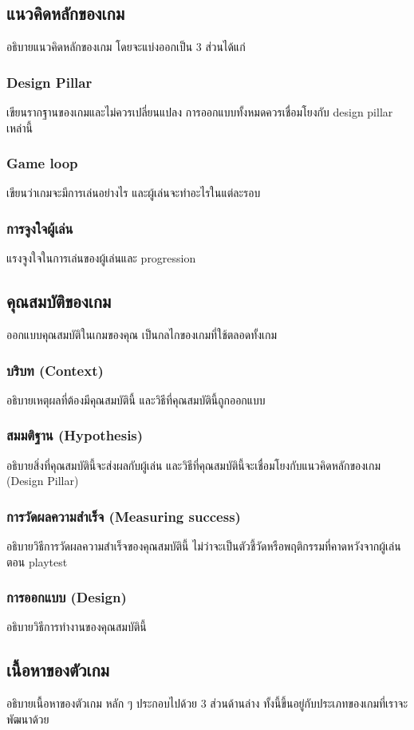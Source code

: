\subsection{แนวคิดหลักของเกม}
อธิบายแนวคิดหลักของเกม โดยจะแบ่งออกเป็น 3 ส่วนได้แก่
\subsubsection{Design Pillar}
เขียนรากฐานของเกมและไม่ควรเปลี่ยนแปลง การออกแบบทั้งหมดควรเชื่อมโยงกับ design pillar เหล่านี้
\subsubsection{Game loop}
เขียนว่าเกมจะมีการเล่นอย่างไร และผู้เล่นจะทำอะไรในแต่ละรอบ
\subsubsection{การจูงใจผู้เล่น}
แรงจูงใจในการเล่นของผู้เล่นและ progression

\subsection{คุณสมบัติของเกม} 
ออกแบบคุณสมบัติในเกมของคุณ เป็นกลไกของเกมที่ใช้ตลอดทั้งเกม

\subsubsection{บริบท (Context)}
อธิบายเหตุผลที่ต้องมีคุณสมบัตินี้ และวิธีที่คุณสมบัตินี้ถูกออกแบบ
\subsubsection{สมมติฐาน (Hypothesis)}
อธิบายสิ่งที่คุณสมบัตินี้จะส่งผลกับผู้เล่น และวิธีที่คุณสมบัตินี้จะเชื่อมโยงกับแนวคิดหลักของเกม (Design Pillar)
\subsubsection{การวัดผลความสำเร็จ (Measuring success)}
อธิบายวิธีการวัดผลความสำเร็จของคุณสมบัตินี้ ไม่ว่าจะเป็นตัวชี้วัดหรือพฤติกรรมที่คาดหวังจากผู้เล่นตอน playtest
\subsubsection{การออกแบบ (Design)}
อธิบายวิธีการทำงานของคุณสมบัตินี้

\subsection{เนื้อหาของตัวเกม}
อธิบายเนื้อหาของตัวเกม หลัก ๆ ประกอบไปด้วย 3 ส่วนด้านล่าง ทั้งนี้ขึ้นอยู่กับประเภทของเกมที่เราจะพัฒนาด้วย

